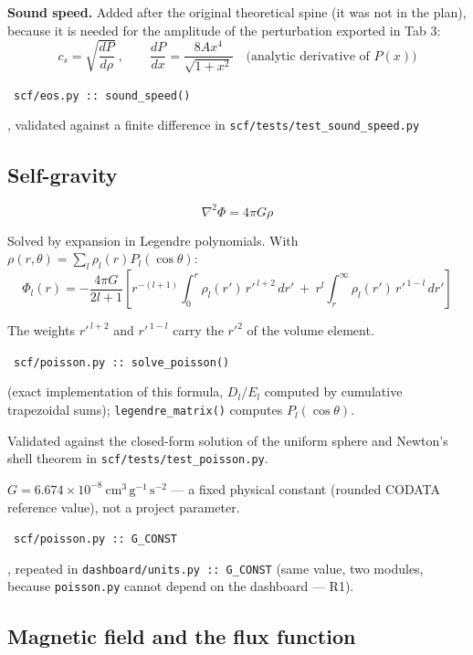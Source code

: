 \documentclass[11pt,a4paper]{scrartcl}
\newcommand{\arrowto}[1]{%
  \par\vspace{2pt}\noindent{\color{linkblue}$\rightarrow$}~\texttt{\small #1}\par\vspace{2pt}}
\newcommand{\code}[1]{\texttt{\small #1}}
\begin{document}
\textbf{Sound speed.} Added after the original theoretical spine (it was
not in the plan), because it is needed for the amplitude of the
perturbation exported in Tab 3:
\begin{equation}
c_s = \sqrt{\frac{dP}{d\rho}}\ , \qquad \frac{dP}{dx} = \frac{8Ax^4}{\sqrt{1+x^2}} \quad \text{(analytic derivative of $P(x)$)}
\end{equation}

\arrowto{scf/eos.py :: sound\_speed()}, validated against a finite difference in \code{scf/tests/test\_sound\_speed.py}

\subsection{Self-gravity}

\begin{equation}
\nabla^2\Phi = 4\pi G\rho
\end{equation}

Solved by expansion in Legendre polynomials. With
$\rho(r,\theta) = \sum_l \rho_l(r)P_l(\cos\theta)$:
\begin{equation}
\Phi_l(r) = -\frac{4\pi G}{2l+1}\left[
  r^{-(l+1)}\int_0^r \rho_l(r')\,r'^{\,l+2}\,dr'
  \ +\ r^{l}\int_r^\infty \rho_l(r')\,r'^{\,1-l}\,dr'
\right]
\end{equation}

The weights $r'^{\,l+2}$ and $r'^{\,1-l}$ carry the $r'^2$ of the volume
element.

\arrowto{scf/poisson.py :: solve\_poisson()} (exact implementation of this formula, $D_l/E_l$ computed by cumulative trapezoidal sums); \code{legendre\_matrix()} computes $P_l(\cos\theta)$.

Validated against the closed-form solution of the uniform sphere and
Newton's shell theorem in \code{scf/tests/test\_poisson.py}.

$G=6.674\times10^{-8}\ \mathrm{cm^3\,g^{-1}\,s^{-2}}$ --- a fixed physical
constant (rounded CODATA reference value), not a project parameter.
\arrowto{scf/poisson.py :: G\_CONST}, repeated in \code{dashboard/units.py :: G\_CONST} (same value, two modules, because \code{poisson.py} cannot depend on the dashboard --- R1).

\subsection{Magnetic field and the flux function}
\end{document}
